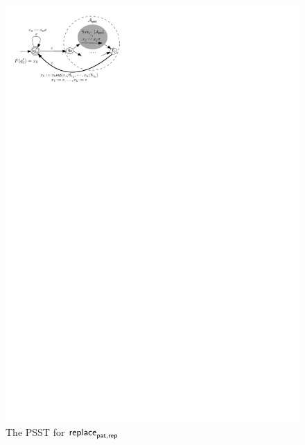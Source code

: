 \begin{figure}[ht]
\centering
\includegraphics[scale=0.65]{psst-replace.pdf}
\caption{The PSST for $\mathsf{replace}_{\mathsf{pat},\mathsf{rep}}$}
\label{fig-psst-replace}
\end{figure}

